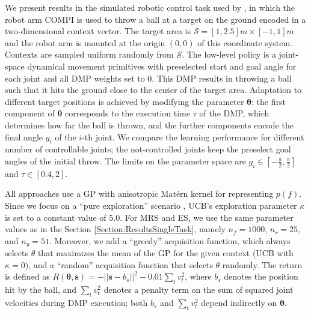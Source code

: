 \documentclass[10pt,letterpaper]{article} %
\begin{document}
We present results in the simulated robotic control task used by
\citet{metzen_active_2015}, in which the robot arm COMPI \cite{COMPI} is used to
throw a ball at a target on the ground encoded in a two-dimensional context
vector. The target area is $\mathcal{S} = [1, 2.5]m \times [-1, 1]m$ and the robot arm is
mounted at the origin $(0, 0)$ of this coordinate system. Contexts are sampled uniform randomly from $\mathcal{S}$.
The low-level policy is a joint-space dynamical movement primitives
\citep[DMP,][]{ijspeert_dynamical_2013} with preselected start and goal angle
for each joint and all DMP weights set to 0. This DMP results in throwing a ball
such that it hits the ground close to the center of the target area. Adaptation
to different target positions is achieved by modifying the parameter
$\mathbf{\theta}$: the first component of $\mathbf{\theta}$ corresponds to the
execution time $\tau$ of the DMP, which determines how far the ball is thrown,
and the further components encode the final angle $g_i$ of the $i$-th joint.
We compare the learning performance for different number of controllable joints;
the not-controlled joints keep the preselect goal angles of the initial throw.
The limits on the parameter space are $g_i \in \left[-\frac{\pi}{2}, \frac{\pi}{2}\right]$ and $\tau \in \left[0.4, 2\right]$.

All approaches use a GP with anisotropic Mat{\'e}rn kernel for representing
$p(f)$. Since we focus on a ``pure exploration'' scenario
\cite{bubeck_pure_2009}, UCB's exploration parameter $\kappa$ is set to a
constant value of $5.0$. For MRS and ES, we use the same parameter values as in
the Section \ref{Section:ResultsSingleTask}, namely $n_f=1000$, $n_r=25$, and $n_y=51$. Moreover, we
add a ``greedy'' acquisition function, which always selects $\theta$ that
maximizes the mean of the GP for the given context (UCB with $\kappa=0$), and a
``random'' acquisition function that selects $\theta$ randomly. The return is
defined as $R(\mathbf{\theta}, \mathbf{s}) = -||\mathbf{s} - b_s||^2 - 0.01
\sum_t v_t^2$, where $b_s$ denotes the position hit by the ball, and $\sum_t
v_t^2$ denotes a penalty term on the sum of squared joint velocities during DMP
execution; both $b_s$ and $\sum_t v_t^2$ depend indirectly on $\mathbf{\theta}$.
\end{document}
